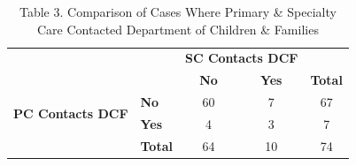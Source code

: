 \documentclass{article}
\begin{document}
	\begin{table}[h]
		\centering
		\footnotesize
		\captionsetup{labelformat=empty}
		\caption{Table 3. Comparison of Cases Where Primary \& Specialty Care Contacted Department of Children \& Families}
		\renewcommand{\arraystretch}{1.2}
		\begin{tabular}{llccc}
			\toprule
			& & \multicolumn{2}{c}{\textbf{SC Contacts DCF}} & \\  
			\cmidrule(lr){3-4}
			& & \textbf{No} & \textbf{Yes} & \textbf{Total} \\  
			\midrule
			\multirow{2}{*}{\textbf{PC Contacts DCF}} & \textbf{No} & 60 & 7 & 67 \\  
			& \textbf{Yes} & 4 & 3 & 7 \\  
			\midrule
			& \textbf{Total} & 64 & 10 & 74 \\  
			\bottomrule
		\end{tabular}
		\label{tab:pc_sc_dcf}
	\end{table}



	
		
\end{document}
